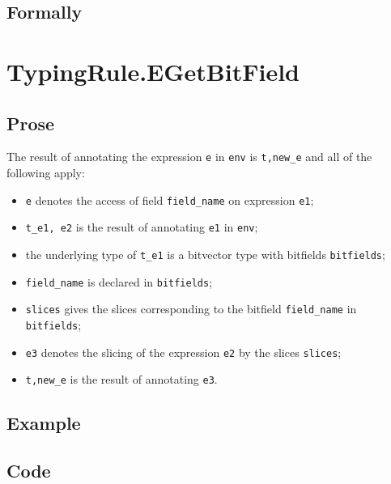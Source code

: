 \documentclass{book}
\begin{document}
\begin{emptyformal}
    \subsection{Formally}

\end{emptyformal}


\section{TypingRule.EGetBitField \label{sec:TypingRule.EGetBitField}}

  \subsection{Prose}
  The result of annotating the expression \texttt{e} in \texttt{env} is
\texttt{t,new\_e} and all of the following apply:
  \begin{itemize}
  \item \texttt{e} denotes the access of field \texttt{field\_name} on expression \texttt{e1};
  \item \texttt{t\_e1, e2} is the result of annotating \texttt{e1} in \texttt{env};
  \item the underlying type of \texttt{t\_e1} is a bitvector type with bitfields \texttt{bitfields};
  \item \texttt{field\_name} is declared in \texttt{bitfields};
  \item \texttt{slices} gives the slices corresponding to the bitfield \texttt{field\_name}
    in \\ \texttt{bitfields};
  \item \texttt{e3} denotes the slicing of the expression \texttt{e2} by the slices \texttt{slices};
  \item \texttt{t,new\_e} is the result of annotating \texttt{e3}.
  \end{itemize}

  \subsection{Example}

  \subsection{Code}
\end{document}
